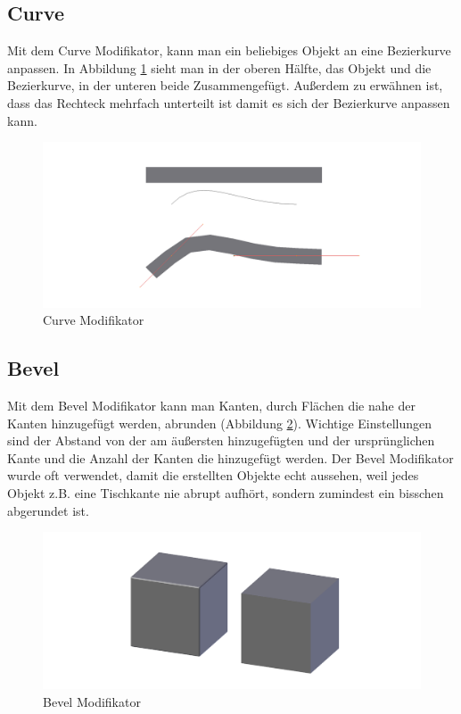 \subsection{Curve}\citep{blender:curve_modifier}
Mit dem Curve Modifikator, kann man ein beliebiges Objekt an eine Bezierkurve anpassen. In Abbildung \ref{modifikatoren:image4} sieht man
in der oberen Hälfte, das Objekt und die Bezierkurve, in der unteren beide Zusammengefügt.
Außerdem zu erwähnen ist, dass das Rechteck mehrfach unterteilt ist damit es sich der Bezierkurve anpassen kann.
\begin{figure}[h]
    \centering
    \includegraphics[width=.8\textwidth]{images/Modifikatoren-Curve.png}
    \caption{Curve Modifikator}
    \label{modifikatoren:image4}
\end{figure}

\subsection{Bevel}\citep{blender:bevel_modifier}
Mit dem Bevel Modifikator kann man Kanten, durch Flächen die nahe der Kanten hinzugefügt werden, abrunden (Abbildung \ref{modifikatoren:image5}).
Wichtige Einstellungen sind der Abstand von der am äußersten hinzugefügten und der ursprünglichen Kante und die Anzahl der Kanten die hinzugefügt werden.
Der Bevel Modifikator wurde oft verwendet, damit die erstellten Objekte echt aussehen, weil jedes Objekt z.B. eine Tischkante nie abrupt
aufhört, sondern zumindest ein bisschen abgerundet ist.
\begin{figure}[h]
    \centering
    \includegraphics[width=.8\textwidth]{images/Modifikatoren-Bevel.png}
    \caption{Bevel Modifikator}
    \label{modifikatoren:image5}
\end{figure}

